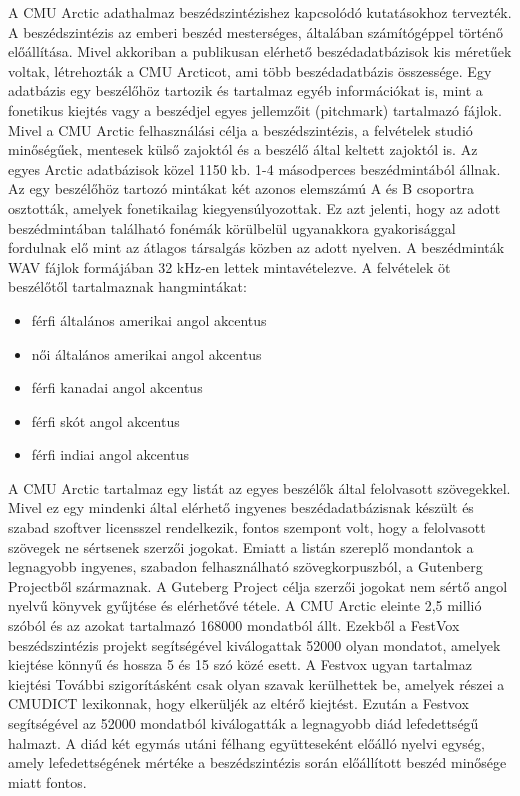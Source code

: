A CMU Arctic adathalmaz beszédszintézishez kapcsolódó kutatásokhoz tervezték. A beszédszintézis az emberi beszéd mesterséges, általában számítógéppel történő előállítása. Mivel akkoriban a publikusan elérhető beszédadatbázisok kis méretűek voltak, létrehozták a CMU Arcticot, ami több beszédadatbázis összessége. Egy adatbázis egy beszélőhöz tartozik és tartalmaz egyéb információkat is, mint a fonetikus kiejtés vagy a beszédjel egyes jellemzőit (pitchmark) tartalmazó fájlok.
\newline
\newline
Mivel a CMU Arctic felhasználási célja a beszédszintézis, a felvételek studió minőségűek, mentesek külső zajoktól és a beszélő által keltett zajoktól is.
\newline
\newline
Az egyes Arctic adatbázisok közel 1150 kb. 1-4 másodperces beszédmintából állnak. Az egy beszélőhöz tartozó mintákat két azonos elemszámú A és B csoportra osztották, amelyek fonetikailag kiegyensúlyozottak. Ez azt jelenti, hogy az adott beszédmintában található fonémák körülbelül ugyanakkora gyakorisággal fordulnak elő mint az átlagos társalgás közben az adott nyelven.
A beszédminták WAV fájlok formájában 32 kHz-en lettek mintavételezve. A felvételek öt beszélőtől tartalmaznak hangmintákat:
\newline
\begin{itemize}
	\item férfi általános amerikai angol akcentus
	\item női általános amerikai angol akcentus
	\item férfi kanadai angol akcentus
	\item férfi skót angol akcentus
	\item férfi indiai angol akcentus
\end{itemize}
\bigskip
A CMU Arctic tartalmaz egy listát az egyes beszélők által felolvasott szövegekkel.
Mivel ez egy mindenki által elérhető ingyenes beszédadatbázisnak készült és szabad szoftver licensszel rendelkezik, fontos szempont volt, hogy a felolvasott szövegek ne sértsenek szerzői jogokat. Emiatt a listán szereplő mondantok a legnagyobb ingyenes, szabadon felhasználható szövegkorpuszból, a Gutenberg Projectből származnak. A Guteberg Project célja szerzői jogokat nem sértő angol nyelvű könyvek gyűjtése és elérhetővé tétele.
\newline
\newline
A CMU Arctic eleinte 2,5 millió szóból és az azokat tartalmazó 168000 mondatból állt. Ezekből a FestVox beszédszintézis projekt segítségével kiválogattak 52000 olyan mondatot, amelyek kiejtése könnyű és hossza 5 és 15 szó közé esett. A Festvox ugyan tartalmaz kiejtési További szigorításként csak olyan szavak kerülhettek be, amelyek részei a CMUDICT lexikonnak, hogy elkerüljék az eltérő kiejtést.
\newline
\newline
Ezután a Festvox segítségével az 52000 mondatból kiválogatták a legnagyobb diád lefedettségű halmazt. A diád két egymás utáni félhang együtteseként előálló nyelvi egység, amely lefedettségének mértéke a beszédszintézis során előállított beszéd minősége miatt fontos. 

